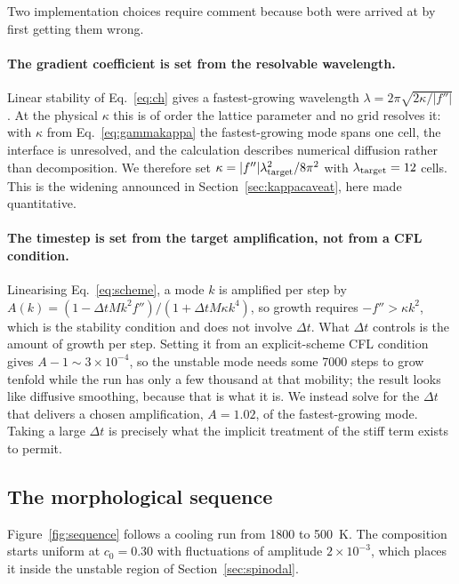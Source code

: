 \documentclass[11pt,a4paper]{article}
\begin{document}
Two implementation choices require comment because both were arrived at by
first getting them wrong.

\paragraph{The gradient coefficient is set from the resolvable wavelength.}
Linear stability of Eq.~\eqref{eq:ch} gives a fastest-growing wavelength
$\lambda = 2\pi\sqrt{2\kappa/|f''|}$. At the physical $\kappa$ this is of order
the lattice parameter and no grid resolves it: with $\kappa$ from
Eq.~\eqref{eq:gammakappa} the fastest-growing mode spans one cell, the interface
is unresolved, and the calculation describes numerical diffusion rather than
decomposition. We therefore set $\kappa = |f''|\lambda_{\rm target}^2/8\pi^2$
with $\lambda_{\rm target} = 12$ cells. This is the widening announced in
Section~\ref{sec:kappacaveat}, here made quantitative.

\paragraph{The timestep is set from the target amplification, not from a CFL
condition.} Linearising Eq.~\eqref{eq:scheme}, a mode $k$ is amplified per step
by $A(k) = (1 - \Delta t M k^2 f'')/(1 + \Delta t M \kappa k^4)$, so growth
requires $-f'' > \kappa k^2$, which is the stability condition and does not
involve $\Delta t$. What $\Delta t$ controls is the amount of growth per step.
Setting it from an explicit-scheme CFL condition gives $A - 1 \sim 3\times
10^{-4}$, so the unstable mode needs some 7000 steps to grow tenfold while the
run has only a few thousand at that mobility; the result looks like diffusive
smoothing, because that is what it is. We instead solve for the $\Delta t$ that
delivers a chosen amplification, $A = 1.02$, of the fastest-growing mode. Taking
a large $\Delta t$ is precisely what the implicit treatment of the stiff term
exists to permit.

\subsection{The morphological sequence}

Figure~\ref{fig:sequence} follows a cooling run from 1800 to 500~K. The
composition starts uniform at $c_0 = 0.30$ with fluctuations of amplitude
$2\times10^{-3}$, which places it inside the unstable region of
Section~\ref{sec:spinodal}.
\end{document}
